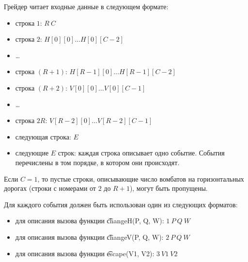Грейдер читает входные данные в следующем формате:
\begin{itemize}
\item строка $1$: $R\ C$
\item строка $2$: $H[0][0]\dots H[0][C­-2]$
\item \dots
\item строка $(R + 1)$: $H[R­-1][0] \dots H[R­-1][C­-2]$
\item строка $(R + 2)$: $V[0][0] \dots V[0][C­-1]$
\item \dots
\item строка $2R$: $V[R­-2][0] \dots V[R­-2][C­-1]$
\item следующая строка: $E$
\item следующие $E$ строк: каждая строка описывает одно событие. События перечислены в том порядке, в котором они происходят.
\end{itemize}
Если $C = 1$, то пустые строки, описывающие число вомбатов на горизонтальных дорогах (строки с номерами от $2$ до $R + 1$), могут быть пропущены.

Для каждого события должен быть использован один из следующих форматов:
\begin{itemize}
\item для описания вызова функции \t{changeH(P, Q, W)}: $1\ P\ Q\ W$
\item для описания вызова функции \t{changeV(P, Q, W)}: $2\ P\ Q\ W$
\item для описания вызова функции \t{escape(V1, V2)}: $3\ V1\ V2$
\end{itemize}

